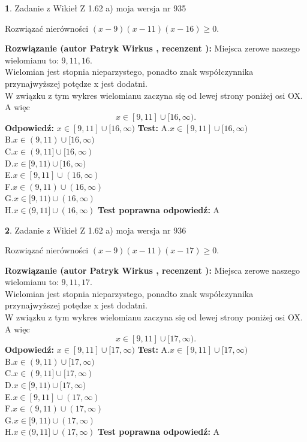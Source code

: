 \documentclass[12pt, a4paper]{article}
\theoremstyle{definition} %
\newtheorem{zad}{}
\newcommand{\zadStart}[1]{\begin{zad}#1\newline}
\newcommand{\zadStop}{\end{zad}}
\newcommand{\rozwStart}[2]{\noindent \textbf{Rozwiązanie (autor #1 , recenzent #2): }\newline}
\newcommand{\rozwStop}{\newline}
\newcommand{\odpStart}{\noindent \textbf{Odpowiedź:}\newline}
\newcommand{\odpStop}{\newline}
\newcommand{\testStart}{\noindent \textbf{Test:}\newline}
\newcommand{\testStop}{\newline}
\newcommand{\kluczStart}{\noindent \textbf{Test poprawna odpowiedź:}\newline}
\newcommand{\kluczStop}{\newline}
\begin{document}
\zadStart{Zadanie z Wikieł Z 1.62 a) moja wersja nr 935}

Rozwiązać nierówności $(x-9)(x-11)(x-16)\ge0$.
\zadStop
\rozwStart{Patryk Wirkus}{}
Miejsca zerowe naszego wielomianu to: $9, 11, 16$.\\
Wielomian jest stopnia nieparzystego, ponadto znak współczynnika przy\linebreak najwyższej potędze x jest dodatni.\\ W związku z tym wykres wielomianu zaczyna się od lewej strony poniżej osi OX. A więc $$x \in [9,11] \cup [16,\infty).$$
\rozwStop
\odpStart
$x \in [9,11] \cup [16,\infty)$
\odpStop
\testStart
A.$x \in [9,11] \cup [16,\infty)$\\
B.$x \in (9,11) \cup [16,\infty)$\\
C.$x \in (9,11] \cup [16,\infty)$\\
D.$x \in [9,11) \cup [16,\infty)$\\
E.$x \in [9,11] \cup (16,\infty)$\\
F.$x \in (9,11) \cup (16,\infty)$\\
G.$x \in [9,11) \cup (16,\infty)$\\
H.$x \in (9,11] \cup (16,\infty)$
\testStop
\kluczStart
A
\kluczStop



\zadStart{Zadanie z Wikieł Z 1.62 a) moja wersja nr 936}

Rozwiązać nierówności $(x-9)(x-11)(x-17)\ge0$.
\zadStop
\rozwStart{Patryk Wirkus}{}
Miejsca zerowe naszego wielomianu to: $9, 11, 17$.\\
Wielomian jest stopnia nieparzystego, ponadto znak współczynnika przy\linebreak najwyższej potędze x jest dodatni.\\ W związku z tym wykres wielomianu zaczyna się od lewej strony poniżej osi OX. A więc $$x \in [9,11] \cup [17,\infty).$$
\rozwStop
\odpStart
$x \in [9,11] \cup [17,\infty)$
\odpStop
\testStart
A.$x \in [9,11] \cup [17,\infty)$\\
B.$x \in (9,11) \cup [17,\infty)$\\
C.$x \in (9,11] \cup [17,\infty)$\\
D.$x \in [9,11) \cup [17,\infty)$\\
E.$x \in [9,11] \cup (17,\infty)$\\
F.$x \in (9,11) \cup (17,\infty)$\\
G.$x \in [9,11) \cup (17,\infty)$\\
H.$x \in (9,11] \cup (17,\infty)$
\testStop
\kluczStart
A
\kluczStop
\end{document}
